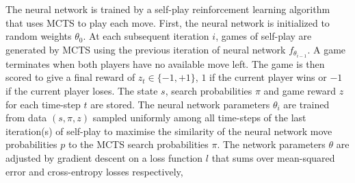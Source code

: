 \documentclass[12pt,a4paper]{report}
\begin{document}
The neural network is trained by a self-play reinforcement learning algorithm that uses MCTS to play each move. First, the neural network is initialized to random weights \(\theta_0\). At each subsequent iteration \(i\), games of self-play are generated by MCTS using the previous iteration of neural network \(f_{\theta_{i−1}}\). A game terminates when both players have no available move left. The game is then scored to give a final reward of \(z_t \in \{−1, +1\}\), \(1\) if the current player wins or \(-1\) if the current player loses. The state \(s\), search probabilities \(\pi\) and game reward \(z\) for each time-step \(t\) are stored. The neural network parameters \(\theta_i\) are trained from data \((s, \pi, z)\) sampled uniformly among all time-steps of the last iteration(s) of self-play to maximise the similarity of the neural network move probabilities \(p\) to the MCTS search probabilities \(\pi\). The network parameters \(\theta\) are adjusted by gradient descent on a loss function \(l\) that sums over mean-squared error and cross-entropy losses respectively,\par
\end{document}
